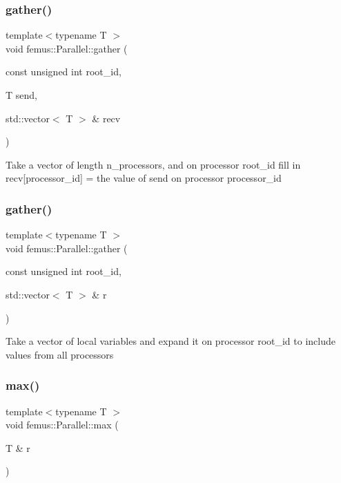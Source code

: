 \subsubsection{\texorpdfstring{gather()}{gather()}\hspace{0.1cm}{\footnotesize\ttfamily [1/2]}}
{\footnotesize\ttfamily template$<$typename T $>$ \\
void femus\+::\+Parallel\+::gather (\begin{DoxyParamCaption}\item[{const unsigned int}]{root\+\_\+id,  }\item[{T}]{send,  }\item[{std\+::vector$<$ T $>$ \&}]{recv }\end{DoxyParamCaption})\hspace{0.3cm}{\ttfamily [inline]}}

Take a vector of length n\+\_\+processors, and on processor root\+\_\+id fill in recv\mbox{[}processor\+\_\+id\mbox{]} = the value of send on processor processor\+\_\+id \mbox{\label{namespacefemus_1_1_parallel_a8c6205b6971503ed97d8c013f226c1db}} 
\subsubsection{\texorpdfstring{gather()}{gather()}\hspace{0.1cm}{\footnotesize\ttfamily [2/2]}}
{\footnotesize\ttfamily template$<$typename T $>$ \\
void femus\+::\+Parallel\+::gather (\begin{DoxyParamCaption}\item[{const unsigned int}]{root\+\_\+id,  }\item[{std\+::vector$<$ T $>$ \&}]{r }\end{DoxyParamCaption})\hspace{0.3cm}{\ttfamily [inline]}}

Take a vector of local variables and expand it on processor root\+\_\+id to include values from all processors \mbox{\label{namespacefemus_1_1_parallel_af18000527efd43ab82a8734b3c6d91f1}} 
\subsubsection{\texorpdfstring{max()}{max()}\hspace{0.1cm}{\footnotesize\ttfamily [1/2]}}
{\footnotesize\ttfamily template$<$typename T $>$ \\
void femus\+::\+Parallel\+::max (\begin{DoxyParamCaption}\item[{T \&}]{r }\end{DoxyParamCaption})\hspace{0.3cm}{\ttfamily [inline]}}

